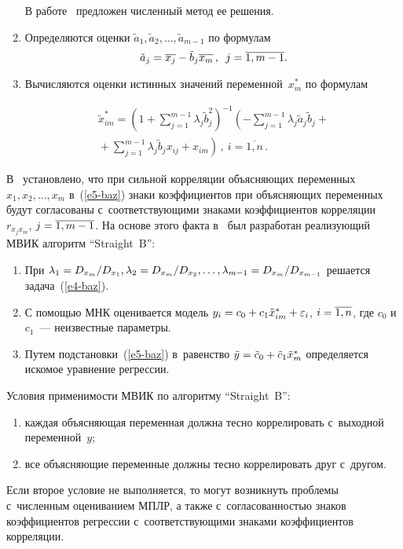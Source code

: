 \begin{multicols}{2}
\begin{enumerate}[1.]
  В работе~\cite{9-baz} предложен численный метод ее решения.
\item Определяются оценки $\tilde{a}_1, \tilde{a}_2, \ldots , \tilde{a}_{m-1}$ по 
формулам
$$
\tilde{a}_j= \overline{x_j} - \tilde{b}_j \overline{x_m}\,,\enskip
j= \overline{1,m-1}.
$$
\item Вычисляются оценки истинных значений переменной~$x_m^*$ по 
формулам

\noindent
\begin{multline}
\tilde{x}_{im}^*= \left( 1+\sum\limits_{j=1}^{m-1} \lambda_j 
\tilde{b}_j^2\right)^{-1} \left( -\sum\limits_{j=1}^{m-1} \lambda_j \tilde{a}_j 
\tilde{b}_j +{}\right.\\
\left.{}+\sum\limits_{j=1}^{m-1} \lambda_j \tilde{b}_j x_{ij} +x_{im}\right)\,,\
i=\overline{1,n}\,.
\label{e5-baz}
\end{multline}
  \end{enumerate}
  
  В~\cite{9-baz} установлено, что при сильной корреляции объясняющих 
переменных $x_1, x_2, \ldots , x_m$ в~(\ref{e5-baz}) знаки коэффициентов при 
объясняющих переменных будут согласованы с~соответствующими знаками 
коэффициентов корреляции~$r_{x_jx_m}$, $j\hm= \overline{1,m-1}$. На основе 
этого факта в~\cite{9-baz} был разработан реализующий МВИК алгоритм 
``Straight~B'':
  \begin{enumerate}[1.]
\item При $\lambda_1=D_{x_m}/D_{x_1}, \lambda_2\hm= D_{x_m}/D_{x_2}, 
\ldots , \lambda_{m-1}\hm= D_{x_m}/D_{x_{m-1}}$ решается  
задача~(\ref{e4-baz}).
\item С помощью МНК оценивается модель $y_i\hm= c_0 \hm+ c_1 
\tilde{x}_{im}^* \hm+ \varepsilon_i$, $i\hm= \overline{1,n}$, где  
$c_0$ и~$c_1$~--- неизвестные параметры.
\item Путем подстановки~(\ref{e5-baz}) в~равенство $\tilde{y}\hm= \tilde{c}_0 
\hm+ \tilde{c}_1\tilde{x}_m^*$ определяется искомое уравнение регрессии.
\end{enumerate}
  
  Условия применимости МВИК по алгоритму ``Straight~B'':
  \begin{enumerate}[(1)]
\item каждая объясняющая переменная должна тесно коррелировать с~выходной 
переменной~$y$;
\item все объясняющие переменные должны тесно коррелировать друг 
с~другом.
\end{enumerate}
  
  Если второе условие не выполняется, то могут возникнуть проблемы 
с~численным оцениванием МПЛР, а также с~согласованностью знаков 
коэффициентов регрессии с~соответствующими знаками коэффициентов 
корреляции.
  

\end{multicols}
